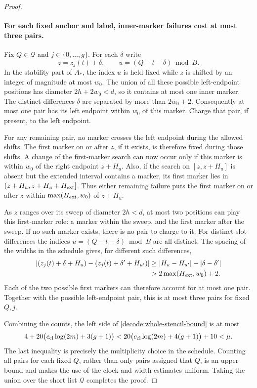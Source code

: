 \begin{proof}
\paragraph{For each fixed anchor and label, inner-marker failures
cost at most three pairs.}
Fix $Q\in\mathcal Q$ and $j\in\{0,\ldots,g\}$.
For each $\delta$ write
\[
 z=z_j(t)+\delta,\qquad u=(Q-t-\delta)\bmod B.
\]
In the stability part of $A_*$, the index $u$ is held fixed while
$z$ is shifted by an integer of magnitude at most $w_0$.
The union of all these possible left-endpoint positions has
diameter $2h+2w_0<d$, so it contains at most one inner marker.
The distinct differences $\delta$ are separated by more than
$2w_0+2$.  Consequently at most one pair has its left endpoint
within $w_0$ of this marker.  Charge that pair, if present, to
the left endpoint.

For any remaining pair, no marker crosses the left endpoint
during the allowed shifts.  The first marker on or after $z$,
if it exists, is therefore fixed during those shifts.
A change of the first-marker search can now occur only if this
marker is within $w_0$ of the right endpoint $z+H_u$.
Also, if the search on $[z,z+H_u]$ is absent but the extended
interval contains a marker, its first marker lies in
$(z+H_u,z+H_u+H_{\rm ext}]$.
Thus either remaining failure puts the first marker on or after
$z$ within $\max(H_{\rm ext},w_0)$ of $z+H_u$.

As $z$ ranges over its sweep of diameter $2h<d$, at most two
positions can play this first-marker role: a marker within the
sweep, and the first marker after the sweep.  If no such marker
exists, there is no pair to charge to it.
For distinct-slot differences the indices
$u=(Q-t-\delta)\bmod B$ are all distinct.  The spacing of the
widths in the schedule gives, for different such differences,
\begin{align*}
 |(z_j(t)+\delta+H_u)-(z_j(t)+\delta'+H_{u'})|
 &\ge |H_u-H_{u'}|-|\delta-\delta'|\\
 &>2\max(H_{\rm ext},w_0)+2.
\end{align*}
Each of the two possible first markers can therefore account for
at most one pair.  Together with the possible left-endpoint pair,
this is at most three pairs for fixed $Q,j$.

Combining the counts, the left side of
\eqref{decode:whole-stencil-bound} is at most
\begin{equation}
 4+20\bigl(c_{\rm cl}\log(2m)+3(g+1)\bigr)
 <20\bigl(c_{\rm cl}\log(2m)+4(g+1)\bigr)+10<\mu.
 \label{decode:budget}
\end{equation}
The last inequality is precisely the multiplicity choice in
the schedule.  Counting all pairs for each fixed $Q$, rather
than only pairs assigned that $Q$, is an upper bound and makes
the use of the clock and width estimates uniform.  Taking the
union over the short list $\mathcal Q$ completes the proof.
\end{proof}

